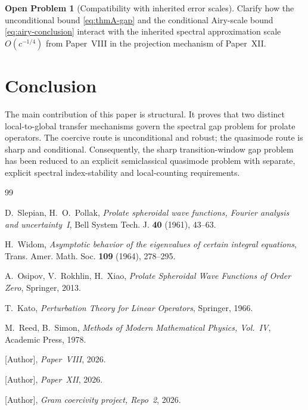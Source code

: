 \documentclass[12pt,a4paper]{amsart}
\theoremstyle{definition}
\newtheorem{problem}[theorem]{Open Problem}
\theoremstyle{remark}
\begin{document}
\begin{problem}[Compatibility with inherited error scales]
\label{prob:compare}
Clarify how the unconditional bound \eqref{eq:thmA-gap} and the conditional
Airy-scale bound \eqref{eq:airy-conclusion} interact with the inherited
spectral approximation scale $O(c^{-1/4})$ from Paper~VIII in the projection
mechanism of Paper~XII.
\end{problem}

\section{Conclusion}
\label{sec:conclusion}

The main contribution of this paper is structural.
It proves that two distinct local-to-global transfer mechanisms govern the
spectral gap problem for prolate operators.
The coercive route is unconditional and robust; the quasimode route is sharp
and conditional.
Consequently, the sharp transition-window gap problem has been reduced to an
explicit semiclassical quasimode problem with separate, explicit spectral
index-stability and local-counting requirements.

\begin{thebibliography}{99}

D.~Slepian, H.~O.~Pollak,
\textit{Prolate spheroidal wave functions, Fourier analysis and uncertainty~I},
Bell System Tech. J. \textbf{40} (1961), 43--63.

H.~Widom,
\textit{Asymptotic behavior of the eigenvalues of certain integral equations},
Trans. Amer. Math. Soc. \textbf{109} (1964), 278--295.

A.~Osipov, V.~Rokhlin, H.~Xiao,
\textit{Prolate Spheroidal Wave Functions of Order Zero},
Springer, 2013.

T.~Kato,
\textit{Perturbation Theory for Linear Operators},
Springer, 1966.

M.~Reed, B.~Simon,
\textit{Methods of Modern Mathematical Physics, Vol.~IV},
Academic Press, 1978.

[Author], \textit{Paper~VIII}, 2026.

[Author], \textit{Paper~XII}, 2026.

[Author], \textit{Gram coercivity project, Repo~2}, 2026.

\end{thebibliography}
\end{document}
